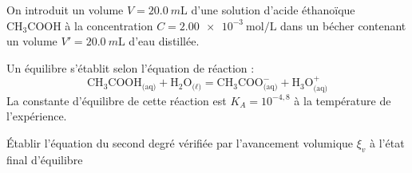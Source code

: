 
\hauteurLargeurCadreReponse		{12mm}{8cm}
\typeEntrainement				{} %
\initialisationEntrainement

\debutEntrainement

On introduit un volume $V=\SI{20,0}{m\liter}$ d'une solution d'acide éthanoïque $\text{CH}_3\text{COOH}$ à la concentration $C= \SI{2,00e-3}{\mol\per\liter}$ dans un bécher contenant un volume $V'=\SI{20,0}{m\liter}$ d'eau distillée. 

Un équilibre s'établit selon l'équation de réaction :
\[
\text{CH}_3\text{COOH}_\text{(aq)}+\text{H}_2\text{O}_\text{($\ell$)}=\text{CH}_3\text{COO}^-_\text{(aq)}+\text{H}_3\text{O}^+_\text{(aq)}
\]
La constante d'équilibre de cette réaction est $K_A=10^{-4,8}$ à la température de l'expérience.


\begin{enonce}
Établir l'équation du second degré vérifiée par l'avancement volumique $\xi_v$ à l'état final d'équilibre

\end{enonce}

